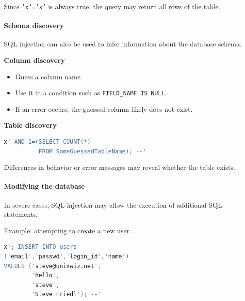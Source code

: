 \vspace{0.3em}

Since \texttt{'x'='x'} is always true, the query may return all rows of the table.

\paragraph{Schema discovery}

SQL injection can also be used to infer information about the database schema.

\vspace{0.3em}

\textbf{Column discovery}

\begin{itemize}
    \item Guess a column name.
    \item Use it in a condition such as \texttt{FIELD\_NAME IS NULL}.
    \item If an error occurs, the guessed column likely does not exist.
\end{itemize}

\vspace{0.3em}

\textbf{Table discovery}

\begin{lstlisting}[language=SQL]
x' AND 1=(SELECT COUNT(*)
          FROM SomeGuessedTableName); --'
\end{lstlisting}

\vspace{0.3em}

Differences in behavior or error messages may reveal whether the table exists.

\paragraph{Modifying the database}

In severe cases, SQL injection may allow the execution of additional SQL statements.

\vspace{0.3em}

Example: attempting to create a new user.

\begin{lstlisting}[language=SQL]
x'; INSERT INTO users
('email','passwd','login_id','name')
VALUES ('steve@unixwiz.net',
        'hello',
        'steve',
        'Steve Friedl'); --'
\end{lstlisting}


